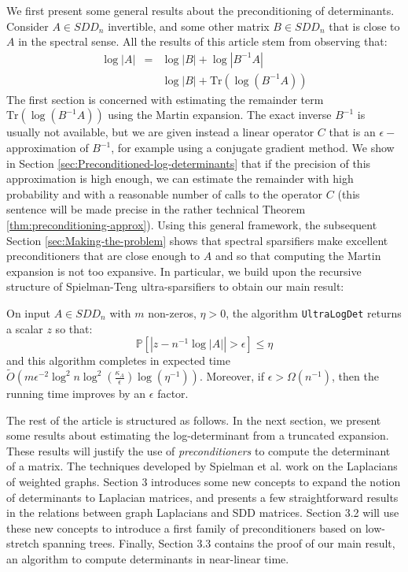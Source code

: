 We first present some general results about the preconditioning of
determinants. Consider $A\in SDD_{n}$ invertible, and some other
matrix $B\in SDD_{n}$ that is close to $A$ in the spectral sense.
All the results of this article stem from observing that: 
\begin{eqnarray*}
\log\left|A\right| & = & \log\left|B\right|+\log\left|B^{-1}A\right|\\
 &  & \log\left|B\right|+\text{Tr}\left(\log\left(B^{-1}A\right)\right)
\end{eqnarray*}
The first section is concerned with estimating the remainder term
$\text{Tr}\left(\log\left(B^{-1}A\right)\right)$ using the Martin
expansion. The exact inverse $B^{-1}$ is usually not available, but
we are given instead a linear operator $C$ that is an $\epsilon-$approximation
of $B^{-1}$, for example using a conjugate gradient method. We show
in Section \ref{sec:Preconditioned-log-determinants} that if the
precision of this approximation is high enough, we can estimate the
remainder with high probability and with a reasonable number of calls
to the operator $C$ (this sentence will be made precise in the rather
technical Theorem \ref{thm:preconditioning-approx}). Using this general
framework, the subsequent Section \ref{sec:Making-the-problem} shows
that spectral sparsifiers make excellent preconditioners that are
close enough to $A$ and so that computing the Martin expansion is
not too expansive. In particular, we build upon the recursive structure
of Spielman-Teng ultra-sparsifiers to obtain our main result:

\begin{theorem}\label{thm:ultra_main}On input $A\in SDD_{n}$ with
$m$ non-zeros, $\eta>0$, the algorithm \texttt{UltraLogDet} returns
a scalar $z$ so that: 
\[
\mathbb{P}\left[\left|z-n^{-1}\log\left|A\right|\right|>\epsilon\right]\leq\eta
\]
and this algorithm completes in expected time $\tilde{O}\left(m\epsilon^{-2}\log^{2}n\log^{2}\left(\frac{\kappa_{A}}{\epsilon}\right)\log\left(\eta^{-1}\right)\right)$.
Moreover, if $\epsilon>\Omega(n^{-1})$, then the running time improves
by an $\epsilon$ factor.

\end{theorem}

The rest of the article is structured as follows. In the next section,
we present some results about estimating the log-determinant from
a truncated expansion. These results will justify the use of \emph{preconditioners
}to compute the determinant of a matrix. The techniques developed
by Spielman et al. work on the Laplacians of weighted graphs. Section
3 introduces some new concepts to expand the notion of determinants
to Laplacian matrices, and presents a few straightforward results
in the relations between graph Laplacians and SDD matrices. Section
3.2 will use these new concepts to introduce a first family of preconditioners
based on low-stretch spanning trees. Finally, Section 3.3 contains
the proof of our main result, an algorithm to compute determinants
in near-linear time. 
